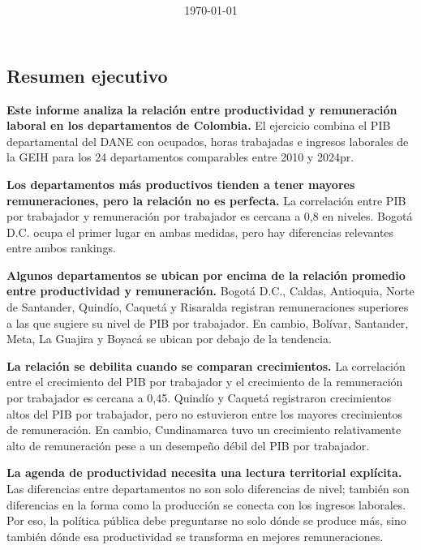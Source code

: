 \documentclass[12pt, a4paper]{article}
\title{\reporttitle\\\reportsubtitle}
\author{\reportauthorone \and \reportauthortwo}
\date{\today}
\begin{document}


\begin{mdframed}[
  linewidth=1pt,
  linecolor=gray!60,
  backgroundcolor=gray!6,
  innertopmargin=12pt,
  innerbottommargin=12pt,
  innerleftmargin=14pt,
  innerrightmargin=14pt
]
\section*{Resumen ejecutivo}

\textbf{Este informe analiza la relación entre productividad y remuneración laboral en los departamentos de Colombia.} El ejercicio combina el PIB departamental del DANE con ocupados, horas trabajadas e ingresos laborales de la GEIH para los 24 departamentos comparables entre 2010 y 2024pr.

\textbf{Los departamentos más productivos tienden a tener mayores remuneraciones, pero la relación no es perfecta.} La correlación entre PIB por trabajador y remuneración por trabajador es cercana a 0,8 en niveles. Bogotá D.C. ocupa el primer lugar en ambas medidas, pero hay diferencias relevantes entre ambos rankings.

\textbf{Algunos departamentos se ubican por encima de la relación promedio entre productividad y remuneración.} Bogotá D.C., Caldas, Antioquia, Norte de Santander, Quindío, Caquetá y Risaralda registran remuneraciones superiores a las que sugiere su nivel de PIB por trabajador. En cambio, Bolívar, Santander, Meta, La Guajira y Boyacá se ubican por debajo de la tendencia.

\textbf{La relación se debilita cuando se comparan crecimientos.} La correlación entre el crecimiento del PIB por trabajador y el crecimiento de la remuneración por trabajador es cercana a 0,45. Quindío y Caquetá registraron crecimientos altos del PIB por trabajador, pero no estuvieron entre los mayores crecimientos de remuneración. En cambio, Cundinamarca tuvo un crecimiento relativamente alto de remuneración pese a un desempeño débil del PIB por trabajador.

\textbf{La agenda de productividad necesita una lectura territorial explícita.} Las diferencias entre departamentos no son solo diferencias de nivel; también son diferencias en la forma como la producción se conecta con los ingresos laborales. Por eso, la política pública debe preguntarse no solo dónde se produce más, sino también dónde esa productividad se transforma en mejores remuneraciones.
\end{mdframed}

\newpage
\tableofcontents
\newpage


\end{document}
